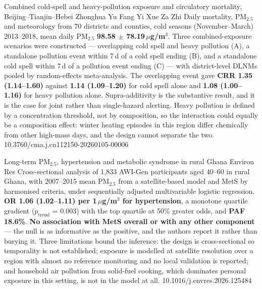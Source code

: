 \documentclass[10pt]{article}
\begin{document}
{Combined cold-spell and heavy-pollution exposure and circulatory mortality, Beijing--Tianjin--Hebei}
{Zhonghua Yu Fang Yi Xue Za Zhi}
{Daily mortality, PM$_{2.5}$ and meteorology from 70 districts and counties, cold seasons
(November--March) 2013--2018, mean daily PM$_{2.5}$ \textbf{98.58 $\pm$ 78.19\,$\mu$g/m$^3$}.
Three combined-exposure scenarios were constructed --- overlapping cold spell and heavy
pollution (A), a standalone pollution event within 7\,d of a cold spell ending (B), and a
standalone cold spell within 7\,d of a pollution event ending (C) --- with district-level
DLNMs pooled by random-effects meta-analysis. The overlapping event gave \textbf{CRR 1.35
(1.14--1.60)} against \textbf{1.14 (1.09--1.20)} for cold spell alone and \textbf{1.08
(1.00--1.16)} for heavy pollution alone. Supra-additivity is the substantive result, and it
is the case for joint rather than single-hazard alerting. Heavy pollution is defined by a
concentration threshold, not by composition, so the interaction could equally be a
composition effect: winter heating episodes in this region differ chemically from other
high-mass days, and the design cannot separate the two.}
{10.3760/cma.j.cn112150-20260105-00006}

{Long-term PM$_{2.5}$, hypertension and metabolic syndrome in rural Ghana}
{Environ Res}
{Cross-sectional analysis of 1{,}833 AWI-Gen participants aged 40--60 in rural Ghana, with
2007--2015 mean PM$_{2.5}$ from a satellite-based model and MetS by harmonised criteria,
under sequentially adjusted multivariable logistic regression. \textbf{OR 1.06 (1.02--1.11)
per 1\,$\mu$g/m$^3$ for hypertension}, a monotone quartile gradient ($p_{\text{trend}}$ =
0.003) with the top quartile at 50\% greater odds, and \textbf{PAF 18.6\%}. \textbf{No
association with MetS overall or with any other component} --- the null is as informative
as the positive, and the authors report it rather than burying it. Three limitations bound
the inference: the design is cross-sectional so temporality is not established; exposure is
modelled at satellite resolution over a region with almost no reference monitoring and no
local validation is reported; and household air pollution from solid-fuel cooking, which
dominates personal exposure in this setting, is not in the model at all.}
{10.1016/j.envres.2026.125484}
\end{document}
